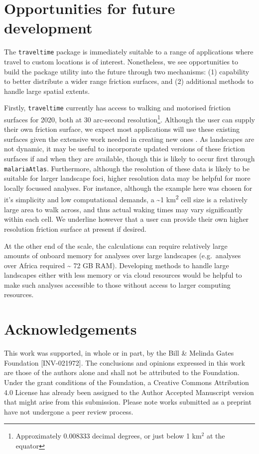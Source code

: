 \documentclass[
  10pt,
  letterpaper,
]{article}
\begin{document}
\section{Opportunities for future
development}\label{opportunities-for-future-development}

The \texttt{traveltime} package is immediately suitable to a range of
applications where travel to custom locations is of interest.
Nonetheless, we see opportunities to build the package utility into the
future through two mechanisms: (1) capability to better distribute a
wider range friction surfaces, and (2) additional methods to handle
large spatial extents.

Firstly, \texttt{traveltime} currently has access to walking and
motorised friction surfaces for 2020, both at 30 arc-second
resolution\footnote{Approximately 0.008333 decimal degrees, or just
  below 1 km\(^2\) at the equator}. Although the user can supply their
own friction surface, we expect most applications will use these
existing surfaces given the extensive work needed in creating new ones
\citep{weiss2018global, weiss2020global}. As landscapes are not dynamic,
it may be useful to incorporate updated versions of these friction
surfaces if and when they are available, though this is likely to occur
first through \texttt{malariaAtlas}. Furthermore, although the
resolution of these data is likely to be suitable for larger landscape
foci, higher resolution data may be helpful for more locally focussed
analyses. For instance, although the example here was chosen for it's
simplicity and low computational demands, a \textasciitilde1
km\textsuperscript{2} cell size is a relatively large area to walk
across, and thus actual waking times may vary significantly within each
cell. We underline however that a user can provide their own higher
resolution friction surface at present if desired.

At the other end of the scale, the calculations can require relatively
large amounts of onboard memory for analyses over large landscapes
(e.g.~analyses over Africa required \textasciitilde{} 72 GB RAM).
Developing methods to handle large landscapes either with less memory or
via cloud resources would be helpful to make such analyses accessible to
those without access to larger computing resources.

\section{Acknowledgements}\label{acknowledgements}

This work was supported, in whole or in part, by the Bill \& Melinda
Gates Foundation {[}INV-021972{]}. The conclusions and opinions
expressed in this work are those of the authors alone and shall not be
attributed to the Foundation. Under the grant conditions of the
Foundation, a Creative Commons Attribution 4.0 License has already been
assigned to the Author Accepted Manuscript version that might arise from
this submission. Please note works submitted as a preprint have not
undergone a peer review process.


\renewcommand\refname{References}
  
\end{document}

